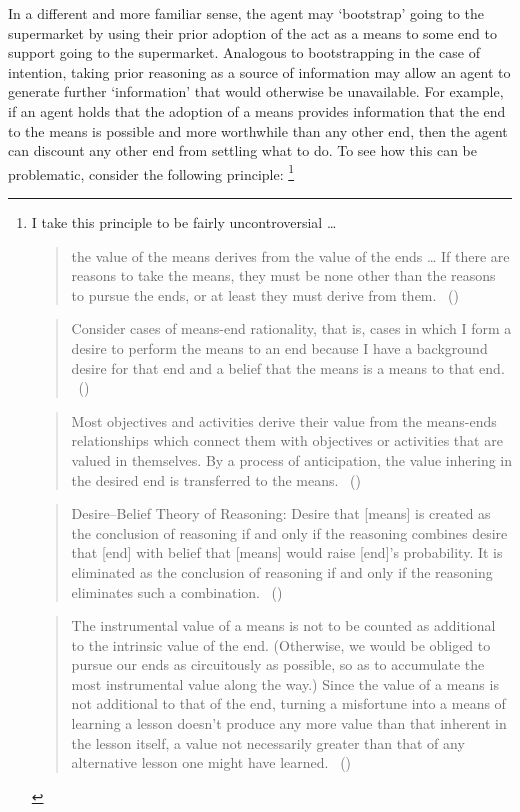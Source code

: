 \documentclass[10pt]{article}
\begin{document}
In a different and more familiar sense, the agent may `bootstrap' going to the supermarket by using their prior adoption of the act as a means to some end to support going to the supermarket.
Analogous to bootstrapping in the case of intention, taking prior reasoning as a source of information may allow an agent to generate further `information' that would otherwise be unavailable.
For example, if an agent holds that the adoption of a means provides information that the end to the means is possible and more worthwhile than any other end, then the agent can discount any other end from settling what to do.
To see how this can be problematic, consider the following principle:\nolinebreak
\footnote{I take this principle to be fairly uncontroversial \dots
  \begin{quote}
    the value of the means derives from the value of the ends \dots
    If there are reasons to take the means, they must be none other than the reasons to pursue the ends, or at least they must derive from them.\nolinebreak
  \mbox{ }\hfill(\cite[2]{Raz:2005aa})
\end{quote}

\begin{quote}
  Consider cases of means-end rationality, that is, cases in which I form a desire to perform the means to an end because I have a background desire for that end and a belief that the means is a means to that end.\nolinebreak
  \mbox{ }\hfill(\cite[84]{Smith:2004aa})
\end{quote}

\begin{quote}
  Most objectives and activities derive their value from the means-ends relationships which connect them with objectives or activities that are valued in themselves.
  By a process of anticipation, the value inhering in the desired end is transferred to the means.\nolinebreak
  \mbox{ }\hfill(\cite[61]{Simon:1997aa})
\end{quote}

\begin{quote}
  Desire–Belief Theory of Reasoning: Desire that [means] is created as the conclusion of reasoning if and only if the reasoning combines desire that [end] with belief that [means] would raise [end]'s probability.
  It is eliminated as the conclusion of reasoning if and only if the reasoning eliminates such a combination.\nolinebreak
  \mbox{ }\hfill(\cite[2]{Sinhababu:2017aa})
\end{quote}

\begin{quote}
  The instrumental value of a means is not to be counted as additional to the intrinsic value of the end.
  (Otherwise, we would be obliged to pursue our ends as circuitously as possible, so as to accumulate the most instrumental value along the way.)
  Since the value of a means is not additional to that of the end, turning a misfortune into a means of learning a lesson doesn’t produce any more value than that inherent in the lesson itself, a value not necessarily greater than that of any alternative lesson one might have learned.\nolinebreak
  \mbox{ }\hfill(\cite[65]{Velleman:2000ab})
\end{quote}

}
\end{document}
